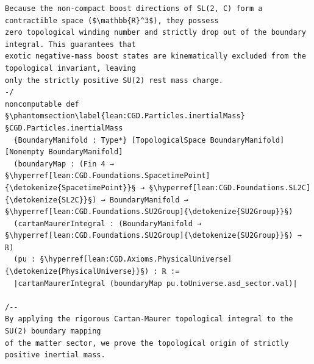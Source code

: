 \begin{verbatim}
Because the non-compact boost directions of SL(2, C) form a contractible space ($\mathbb{R}^3$), they possess 
zero topological winding number and strictly drop out of the boundary integral. This guarantees that 
exotic negative-mass boost states are kinematically excluded from the topological invariant, leaving 
only the strictly positive SU(2) rest mass charge.
-/
noncomputable def §\phantomsection\label{lean:CGD.Particles.inertialMass}§CGD.Particles.inertialMass
  {BoundaryManifold : Type*} [TopologicalSpace BoundaryManifold] [Nonempty BoundaryManifold]
  (boundaryMap : (Fin 4 → §\hyperref[lean:CGD.Foundations.SpacetimePoint]{\detokenize{SpacetimePoint}}§ → §\hyperref[lean:CGD.Foundations.SL2C]{\detokenize{SL2C}}§) → BoundaryManifold → §\hyperref[lean:CGD.Foundations.SU2Group]{\detokenize{SU2Group}}§)
  (cartanMaurerIntegral : (BoundaryManifold → §\hyperref[lean:CGD.Foundations.SU2Group]{\detokenize{SU2Group}}§) → ℝ)
  (pu : §\hyperref[lean:CGD.Axioms.PhysicalUniverse]{\detokenize{PhysicalUniverse}}§) : ℝ :=
  |cartanMaurerIntegral (boundaryMap pu.toUniverse.asd_sector.val)|

/-- 
By applying the rigorous Cartan-Maurer topological integral to the SU(2) boundary mapping 
of the matter sector, we prove the topological origin of strictly positive inertial mass. 


\end{verbatim}
